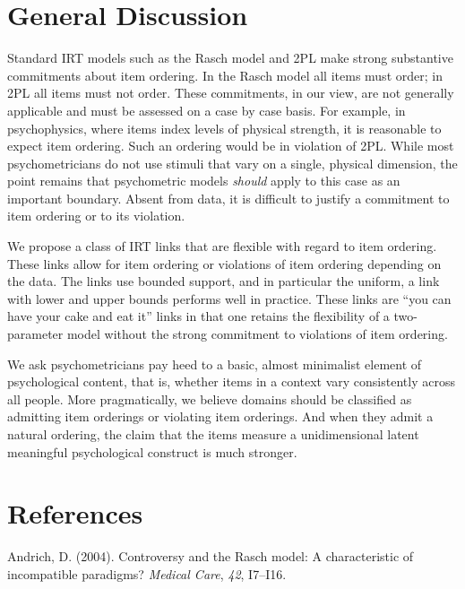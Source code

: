 \documentclass[english,,man]{apa6}
\begin{document}
\hypertarget{general-discussion}{%
\section{General Discussion}\label{general-discussion}}

Standard IRT models such as the Rasch model and 2PL make strong substantive commitments about item ordering. In the Rasch model all items must order; in 2PL all items must not order. These commitments, in our view, are not generally applicable and must be assessed on a case by case basis. For example, in psychophysics, where items index levels of physical strength, it is reasonable to expect item ordering. Such an ordering would be in violation of 2PL. While most psychometricians do not use stimuli that vary on a single, physical dimension, the point remains that psychometric models \emph{should} apply to this case as an important boundary. Absent from data, it is difficult to justify a commitment to item ordering or to its violation.

We propose a class of IRT links that are flexible with regard to item ordering. These links allow for item ordering or violations of item ordering depending on the data. The links use bounded support, and in particular the uniform, a link with lower and upper bounds performs well in practice. These links are \enquote{you can have your cake and eat it} links in that one retains the flexibility of a two-parameter model without the strong commitment to violations of item ordering.

We ask psychometricians pay heed to a basic, almost minimalist element of psychological content, that is, whether items in a context vary consistently across all people. More pragmatically, we believe domains should be classified as admitting item orderings or violating item orderings. And when they admit a natural ordering, the claim that the items measure a unidimensional latent meaningful psychological construct is much stronger.

\newpage

\hypertarget{references}{%
\section*{References}\label{references}}

\hypertarget{refs}{}
\leavevmode\hypertarget{ref-Andrich:2004}{}%
Andrich, D. (2004). Controversy and the Rasch model: A characteristic of incompatible paradigms? \emph{Medical Care}, \emph{42}, I7--I16.
\end{document}
